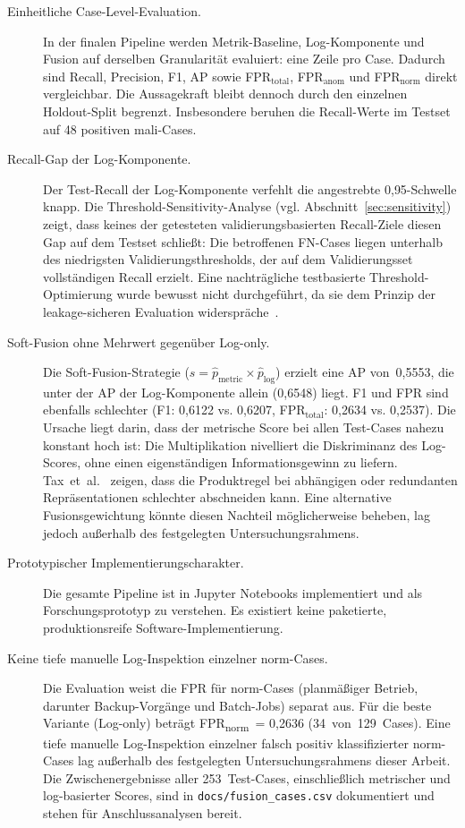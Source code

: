 \begin{description}
  \item[Einheitliche Case-Level-Evaluation.] In der finalen Pipeline werden Metrik-Baseline, Log-Komponente und Fusion auf derselben Granularität evaluiert: eine Zeile pro Case. Dadurch sind Recall, Precision, F1, AP sowie FPR$_{\text{total}}$, FPR$_{\text{anom}}$ und FPR$_{\text{norm}}$ direkt vergleichbar. Die Aussagekraft bleibt dennoch durch den einzelnen Holdout-Split begrenzt. Insbesondere beruhen die Recall-Werte im Testset auf 48 positiven mali-Cases.

  \item[Recall-Gap der Log-Komponente.] Der Test-Recall der Log-Komponente verfehlt die angestrebte 0{,}95-Schwelle knapp. Die Threshold-Sensitivity-Analyse (vgl. Abschnitt~\ref{sec:sensitivity}) zeigt, dass keines der getesteten validierungsbasierten Recall-Ziele diesen Gap auf dem Testset schließt: Die betroffenen FN-Cases liegen unterhalb des niedrigsten Validierungsthresholds, der auf dem Validierungsset vollständigen Recall erzielt. Eine nachträgliche testbasierte Threshold-Optimierung wurde bewusst nicht durchgeführt, da sie dem Prinzip der leakage-sicheren Evaluation widerspräche~\cite{cawley2010over}.

  \item[Soft-Fusion ohne Mehrwert gegenüber Log-only.] Die Soft-Fusion-Strategie\hfil\break
($s = \hat{p}_{\text{metric}} \times \hat{p}_{\text{log}}$) erzielt eine AP von~0{,}5553, die unter der AP der Log-Komponente allein (0{,}6548) liegt. F1 und FPR sind ebenfalls schlechter (F1: 0{,}6122 vs. 0{,}6207, FPR$_{\text{total}}$: 0{,}2634 vs. 0{,}2537). Die Ursache liegt darin, dass der metrische Score bei allen Test-Cases nahezu konstant hoch ist: Die Multiplikation nivelliert die Diskriminanz des Log-Scores, ohne einen eigenständigen Informationsgewinn zu liefern. Tax~et~al.~\cite{tax2000combining} zeigen, dass die Produktregel bei abhängigen oder redundanten Repräsentationen schlechter abschneiden kann. Eine alternative Fusionsgewichtung könnte diesen Nachteil möglicherweise beheben, lag jedoch außerhalb des festgelegten Untersuchungsrahmens.

  \item[Prototypischer Implementierungscharakter.] Die gesamte Pipeline ist in Jupyter Notebooks implementiert und als Forschungsprototyp zu verstehen. Es existiert keine paketierte, produktionsreife Software-Implementierung.

  \item[Keine tiefe manuelle Log-Inspektion einzelner norm-Cases.] Die Evaluation weist\hfil\break
die FPR für norm-Cases (planmäßiger Betrieb, darunter Backup-Vorgänge und Batch-Jobs) separat aus. Für die beste Variante (Log-only) beträgt FPR\textsubscript{norm}~= 0{,}2636 (34~von~129~Cases). Eine tiefe manuelle Log-Inspektion einzelner falsch positiv klassifizierter norm-Cases lag außerhalb des festgelegten Untersuchungsrahmens dieser Arbeit. Die Zwischenergebnisse aller 253~Test-Cases, einschließlich metrischer und log-basierter Scores, sind in \texttt{docs/fusion\_cases.csv} dokumentiert und stehen für Anschlussanalysen bereit.
\end{description}

